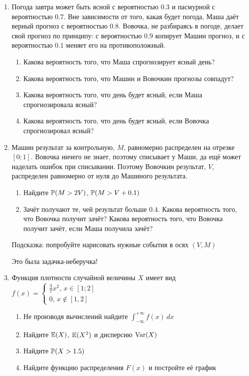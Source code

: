 \documentclass[12pt, a4paper]{article}\usepackage[]{graphicx}\usepackage[]{color}
\begin{document}
\begin{enumerate}

\item Погода завтра может быть ясной с вероятностью $0.3$ и пасмурной с вероятностью $0.7$. Вне зависимости от того, какая будет погода, Маша даёт верный прогноз с вероятностью $0.8$. Вовочка, не разбираясь в погоде, делает свой прогноз по принципу: с вероятностью $0.9$ копирует Машин прогноз, и с вероятностью $0.1$ меняет его на противоположный.
\begin{enumerate}
\item Какова вероятность того, что Маша спрогнозирует ясный день?
\item Какова вероятность того, что Машин и Вовочкин прогнозы совпадут?
\item Какова вероятность того, что день будет ясный, если Маша спрогнозировала ясный?
\item Какова вероятность того, что день будет ясный, если Вовочка спрогнозировал ясный?
\end{enumerate}

\item Машин результат за контрольную, $M$, равномерно распределен на отрезке $[0;1]$. Вовочка ничего не знает, поэтому списывает у Маши, да ещё может наделать ошибок при списывании. Поэтому Вовочкин результат, $V$, распределен равномерно от нуля до Машиного результата.
\begin{enumerate}
\item Найдите $\P(M>2V)$, $\P(M>V+0.1)$
\item Зачёт получают те, чей результат больше $0.4$. Какова вероятность того, что Вовочка получит зачёт? Какова вероятность того, что Вовочка получит зачёт, если Маша получила зачёт?
\end{enumerate}
Подсказка: попробуйте нарисовать нужные события в осях $(V,M)$

Это была задачка-неберучка!

\item Функция плотности случайной величины $X$ имеет вид $f(x)=\left\{\begin{array}{l}
\frac{3}{7}x^2,\, x\in[1;2] \\
0,\, x\notin [1,2]
\end{array}\right.$
\begin{enumerate}
\item Не производя вычислений найдите $\int_{-\infty}^{+\infty}f(x)\,dx$
\item Найдите $\E(X)$, $\E(X^2)$ и дисперсию $\Var(X)$
\item Найдите $\P(X>1.5)$
\item Найдите функцию распределения $F(x)$ и постройте её график
\end{enumerate}


\end{enumerate}
\end{document}
